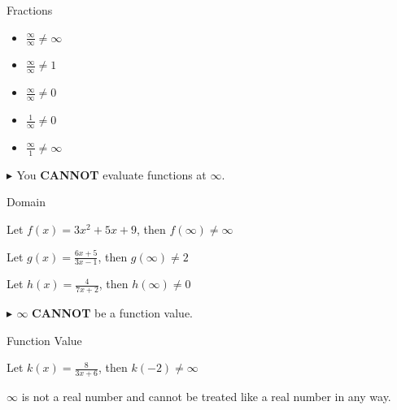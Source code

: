 \documentclass{ximera}
\begin{document}
\begin{example} Fractions


\begin{itemize}
\item $\frac{\infty}{\infty} \ne \infty$
\item $\frac{\infty}{\infty} \ne 1$
\item $\frac{\infty}{\infty} \ne 0$
\item $\frac{1}{\infty} \ne 0$
\item $\frac{\infty}{1} \ne \infty$
\end{itemize}


\end{example}








\textbf{\textcolor{red!70!darkgray}{$\blacktriangleright$ }} You \textbf{\textcolor{red!70!black}{CANNOT}} evaluate functions at $\infty$.



\begin{example} Domain


Let $f(x) = 3x^2 + 5x + 9$, then $f(\infty) \ne \infty$ 

Let $g(x) = \frac{6x + 5}{3x - 1}$, then $g(\infty) \ne 2$ 

Let $h(x) = \frac{4}{7x + 2}$, then $h(\infty) \ne 0$ 

\end{example}











\textbf{\textcolor{red!70!darkgray}{$\blacktriangleright$ }} $\infty$ \textbf{\textcolor{red!70!black}{CANNOT}} be a function value.



\begin{example} Function Value



Let $k(x) = \frac{8}{3x + 6}$, then $k(-2) \ne \infty$ 

\end{example}

$\infty$ is not a real number and cannot be treated like a real number in any way.
\end{document}

